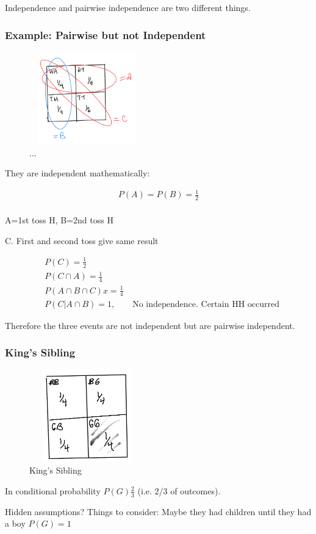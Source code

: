  Independence and pairwise independence are two different things.

\subsubsection{Example: Pairwise but not Independent}

\begin{figure}[ht]
\centering
\includegraphics[width=5cm, height=4cm]{images/L03/collection_indep.jpeg}
\caption{...}
\end{figure}

They are independent mathematically:

\begin{align*}
P(A)=P(B)=\frac{1}{2}\\
\end{align*}

A={1st toss H}, B={2nd toss H}

C. First and second toss give same result

\begin{align*}
&P(C)=\frac{1}{2}\\
&P(C \cap A) = \frac{1}{4}\\
&P(A \cap B \cap C)x = \frac{1}{4}\\
&P(C|A \cap B) = 1, \qquad \text{No independence. Certain HH occurred}
\end{align*}

Therefore the three events are not independent but are pairwise independent.

\subsubsection{King's Sibling}


\begin{figure}[ht]
\centering
\includegraphics[width=5cm, height=4cm]{images/L03/kings_sibling.jpeg}
\caption{King's Sibling}
\end{figure}

In conditional probability $P(G)\frac{2}{3}$ (i.e. 2/3 of outcomes).

Hidden assumptions?  Things to consider: Maybe they had children until they had a boy $P(G)=1$
